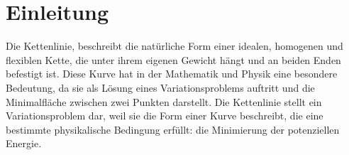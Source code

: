 %
%
%
%
\section{Einleitung\label{kettenlinie:section:Einleitung}}
Die Kettenlinie, beschreibt die natürliche Form einer idealen, homogenen und flexiblen Kette, die unter ihrem eigenen Gewicht hängt und an beiden Enden befestigt ist.
Diese Kurve hat in der Mathematik und Physik eine besondere Bedeutung, da sie als Lösung eines Variationsproblems auftritt und die Minimalfläche zwischen zwei Punkten darstellt.
Die Kettenlinie stellt ein Variationsproblem dar, weil sie die Form einer Kurve beschreibt, die eine bestimmte physikalische Bedingung erfüllt: die Minimierung der potenziellen Energie. 


